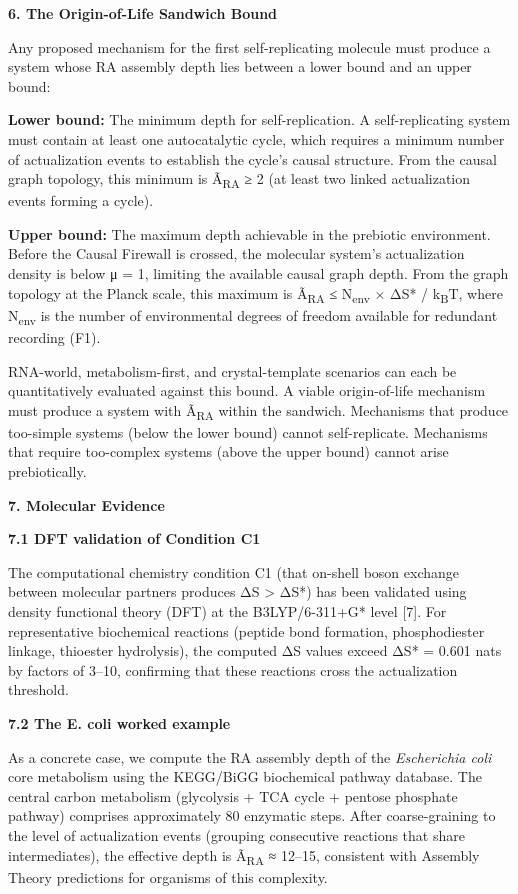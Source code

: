 \documentclass[12pt,a4paper]{article}
\begin{document}
\textbf{6. The Origin-of-Life Sandwich Bound}

Any proposed mechanism for the first self-replicating molecule must
produce a system whose RA assembly depth lies between a lower bound and
an upper bound:

\textbf{Lower bound:} The minimum depth for self-replication. A
self-replicating system must contain at least one autocatalytic cycle,
which requires a minimum number of actualization events to establish the
cycle's causal structure. From the causal graph topology, this minimum
is Ã\textsubscript{RA} ≥ 2 (at least two linked actualization events
forming a cycle).

\textbf{Upper bound:} The maximum depth achievable in the prebiotic
environment. Before the Causal Firewall is crossed, the molecular
system's actualization density is below μ = 1, limiting the available
causal graph depth. From the graph topology at the Planck scale, this
maximum is Ã\textsubscript{RA} ≤ N\textsubscript{env} × ΔS* /
k\textsubscript{B}T, where N\textsubscript{env} is the number of
environmental degrees of freedom available for redundant recording (F1).

RNA-world, metabolism-first, and crystal-template scenarios can each be
quantitatively evaluated against this bound. A viable origin-of-life
mechanism must produce a system with Ã\textsubscript{RA} within the
sandwich. Mechanisms that produce too-simple systems (below the lower
bound) cannot self-replicate. Mechanisms that require too-complex
systems (above the upper bound) cannot arise prebiotically.

\textbf{7. Molecular Evidence}

\textbf{7.1 DFT validation of Condition C1}

The computational chemistry condition C1 (that on-shell boson exchange
between molecular partners produces ΔS \textgreater{} ΔS*) has been
validated using density functional theory (DFT) at the B3LYP/6-311+G*
level {[}7{]}. For representative biochemical reactions (peptide bond
formation, phosphodiester linkage, thioester hydrolysis), the computed
ΔS values exceed ΔS* = 0.601 nats by factors of 3--10, confirming that
these reactions cross the actualization threshold.

\textbf{7.2 The E. coli worked example}

As a concrete case, we compute the RA assembly depth of the
\emph{Escherichia coli} core metabolism using the KEGG/BiGG biochemical
pathway database. The central carbon metabolism (glycolysis + TCA cycle
+ pentose phosphate pathway) comprises approximately 80 enzymatic steps.
After coarse-graining to the level of actualization events (grouping
consecutive reactions that share intermediates), the effective depth is
Ã\textsubscript{RA} ≈ 12--15, consistent with Assembly Theory
predictions for organisms of this complexity.
\end{document}
